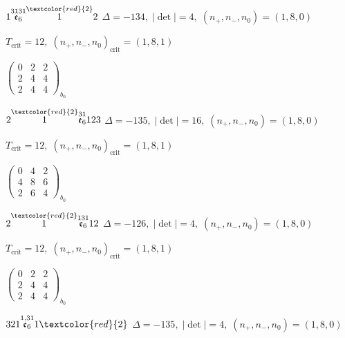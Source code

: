 \documentclass[10pt]{article}
\begin{document}
\smallskip

$1\overset{3131}{\mathfrak{e}_6}\overset{\textcolor{red}{2}}{1}2$ \quad $\Delta=-134,\; |\det|=4,\; (n_+,n_-,n_0)=(1,8,0)$

\hspace{1em}$T_{\text{crit}}=12,\; (n_+,n_-,n_0)_{\text{crit}}=(1,8,1)$

\hspace{2em}$\left(\begin{smallmatrix}0 & 2 & 2 \\ 2 & 4 & 4 \\ 2 & 4 & 4\end{smallmatrix}\right)_{\!b_0}$

\smallskip

$2\overset{\textcolor{red}{2}}{1}\overset{31}{\mathfrak{e}_6}123$ \quad $\Delta=-135,\; |\det|=16,\; (n_+,n_-,n_0)=(1,8,0)$

\hspace{1em}$T_{\text{crit}}=12,\; (n_+,n_-,n_0)_{\text{crit}}=(1,8,1)$

\hspace{2em}$\left(\begin{smallmatrix}0 & 4 & 2 \\ 4 & 8 & 6 \\ 2 & 6 & 4\end{smallmatrix}\right)_{\!b_0}$

\smallskip

$2\overset{\textcolor{red}{2}}{1}\overset{131}{\mathfrak{e}_6}12$ \quad $\Delta=-126,\; |\det|=4,\; (n_+,n_-,n_0)=(1,8,0)$

\hspace{1em}$T_{\text{crit}}=12,\; (n_+,n_-,n_0)_{\text{crit}}=(1,8,1)$

\hspace{2em}$\left(\begin{smallmatrix}0 & 2 & 2 \\ 2 & 4 & 4 \\ 2 & 4 & 4\end{smallmatrix}\right)_{\!b_0}$

\smallskip

$321\overset{1,31}{\mathfrak{e}_6}1\textcolor{red}{2}$ \quad $\Delta=-135,\; |\det|=4,\; (n_+,n_-,n_0)=(1,8,0)$
\end{document}
